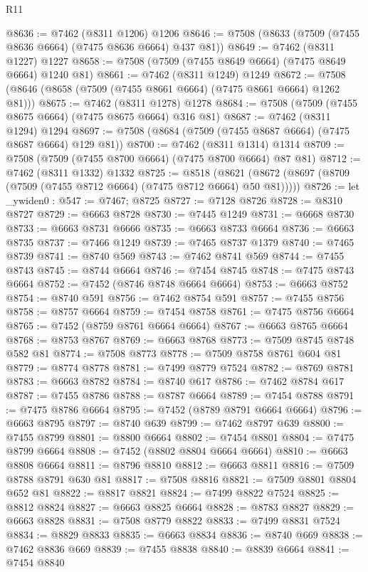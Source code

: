 \begin{lexlean}{R11}
\begin{coremodule}
{{{{{{{{{{{{{{{{{{{{{{{{{{{{{{{{{{{{{{{{{{{{{{{{{{{{{{{{{{{{{{{{{{{{{{{{{{{{{{{{{{@8636 := @7462 (@8311 @1206) @1206
@8646 := @7508 (@8633 (@7509 (@7455 @8636 @6664) (@7475 @8636 @6664) @437 @81))
@8649 := @7462 (@8311 @1227) @1227
@8658 := @7508 (@7509 (@7455 @8649 @6664) (@7475 @8649 @6664) @1240 @81)
@8661 := @7462 (@8311 @1249) @1249
@8672 := @7508 (@8646 (@8658 (@7509 (@7455 @8661 @6664) (@7475 @8661 @6664) @1262 @81)))
@8675 := @7462 (@8311 @1278) @1278
@8684 := @7508 (@7509 (@7455 @8675 @6664) (@7475 @8675 @6664) @316 @81)
@8687 := @7462 (@8311 @1294) @1294
@8697 := @7508 (@8684 (@7509 (@7455 @8687 @6664) (@7475 @8687 @6664) @129 @81))
@8700 := @7462 (@8311 @1314) @1314
@8709 := @7508 (@7509 (@7455 @8700 @6664) (@7475 @8700 @6664) @87 @81)
@8712 := @7462 (@8311 @1332) @1332
@8725 := @8518
    (@8621 (@8672 (@8697 (@8709 (@7509 (@7455 @8712 @6664) (@7475 @8712 @6664) @50 @81)))))
@8726 := let _ywiden0 : @547 := @7467; @8725
@8727 := @7128 @8726
@8728 := @8310 @8727
@8729 := @6663 @8728
@8730 := @7445 @1249
@8731 := @6668 @8730
@8733 := @6663 @8731 @6666
@8735 := @6663 @8733 @6664
@8736 := @6663 @8735
@8737 := @7466 @1249
@8739 := @7465 @8737 @1379
@8740 := @7465 @8739
@8741 := @8740 @569
@8743 := @7462 @8741 @569
@8744 := @7455 @8743
@8745 := @8744 @6664
@8746 := @7454 @8745
@8748 := @7475 @8743 @6664
@8752 := @7452 (@8746 @8748 @6664 @6664)
@8753 := @6663 @8752
@8754 := @8740 @591
@8756 := @7462 @8754 @591
@8757 := @7455 @8756
@8758 := @8757 @6664
@8759 := @7454 @8758
@8761 := @7475 @8756 @6664
@8765 := @7452 (@8759 @8761 @6664 @6664)
@8767 := @6663 @8765 @6664
@8768 := @8753 @8767
@8769 := @6663 @8768
@8773 := @7509 @8745 @8748 @582 @81
@8774 := @7508 @8773
@8778 := @7509 @8758 @8761 @604 @81
@8779 := @8774 @8778
@8781 := @7499 @8779 @7524
@8782 := @8769 @8781
@8783 := @6663 @8782
@8784 := @8740 @617
@8786 := @7462 @8784 @617
@8787 := @7455 @8786
@8788 := @8787 @6664
@8789 := @7454 @8788
@8791 := @7475 @8786 @6664
@8795 := @7452 (@8789 @8791 @6664 @6664)
@8796 := @6663 @8795
@8797 := @8740 @639
@8799 := @7462 @8797 @639
@8800 := @7455 @8799
@8801 := @8800 @6664
@8802 := @7454 @8801
@8804 := @7475 @8799 @6664
@8808 := @7452 (@8802 @8804 @6664 @6664)
@8810 := @6663 @8808 @6664
@8811 := @8796 @8810
@8812 := @6663 @8811
@8816 := @7509 @8788 @8791 @630 @81
@8817 := @7508 @8816
@8821 := @7509 @8801 @8804 @652 @81
@8822 := @8817 @8821
@8824 := @7499 @8822 @7524
@8825 := @8812 @8824
@8827 := @6663 @8825 @6664
@8828 := @8783 @8827
@8829 := @6663 @8828
@8831 := @7508 @8779 @8822
@8833 := @7499 @8831 @7524
@8834 := @8829 @8833
@8835 := @6663 @8834
@8836 := @8740 @669
@8838 := @7462 @8836 @669
@8839 := @7455 @8838
@8840 := @8839 @6664
@8841 := @7454 @8840
}}}}}}}}}}}}}}}}}}}}}}}}}}}}}}}}}}}}}}}}}}}}}}}}}}}}}}}}}}}}}}}}}}}}}}}}}}}}}}}}}}
\end{coremodule}
\end{lexlean}
